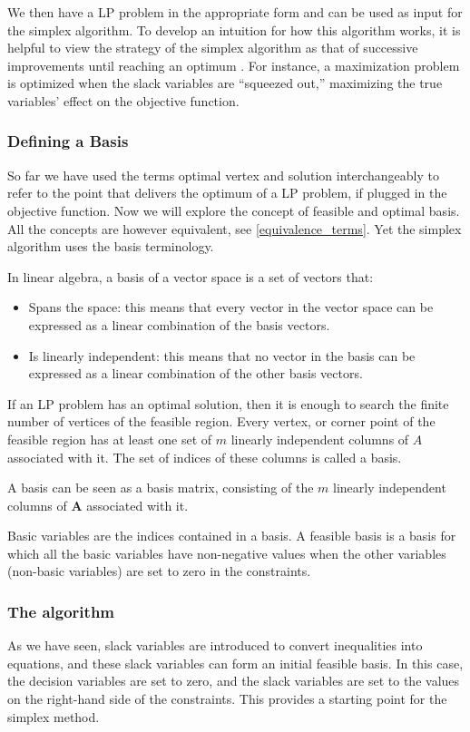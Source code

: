 We then have a LP problem in the appropriate form and can be used as input for the simplex algorithm. To develop an intuition for how this algorithm works, it is helpful to view the strategy of the simplex algorithm as that of successive improvements until reaching an optimum \parencite{chvatal1983linear}. For instance, a maximization problem is optimized when the slack variables are “squeezed out,” maximizing the true variables’ effect on the objective function.

\subsubsection{Defining a Basis}
So far we have used the terms optimal vertex and solution interchangeably to refer
to the point that delivers the optimum of a LP problem, if plugged in the objective function. Now we will explore the concept of feasible and optimal basis. All the concepts are however equivalent, see \ref{equivalence_terms}. Yet the simplex algorithm uses the basis terminology.

In linear algebra, a basis of a vector space is a set of vectors that:
\begin{itemize}
    \item Spans the space: this means that every vector in the vector space
          can be expressed as a linear combination of the basis vectors.
    \item Is linearly independent: this means that no vector in the basis can be
          expressed as a linear combination of the other basis vectors.
\end{itemize}

If an LP problem has an optimal solution, then it is enough to search the finite number of vertices of the feasible region. Every vertex, or corner point of the feasible region has at least one set of $m$ linearly independent columns of $A$ associated with it. The set of indices of these columns is called a basis.

A basis can be seen as a basis matrix, consisting of the $m$ linearly independent columns of $\mathbf{A}$ associated with it.

Basic variables are the indices contained in a basis. A feasible basis is a basis for which all the basic variables have non-negative values when the other variables (non-basic variables) are set to zero in the constraints.

\subsubsection{The algorithm}
As we have seen, slack variables are introduced to convert inequalities into equations, and these slack variables can form an initial feasible basis. In this case, the decision variables are set to zero, and the slack variables are set to the values on the right-hand side of the constraints. This provides a starting point for the simplex method.

